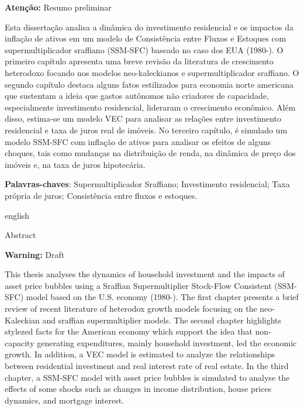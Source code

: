 \documentclass[
12pt,				%
openright,			%
oneside,			%
a4paper,		%
english,			%
brazil,				%
sumario=tradicional,
]{abntex2}
\begin{document}
%

\begin{resumo}

\textbf{Atenção:} Resumo preliminar

Esta dissertação analisa a dinâmica do investimento residencial e os impactos da inflação de ativos em um modelo de Consistência entre Fluxos e Estoques com supermultiplicador sraffiano (SSM-SFC) baseado no caso dos EUA (1980-). O primeiro capítulo apresenta uma breve revisão da literatura de crescimento heterodoxo focando nos modelos neo-kaleckianos e supermultiplicador sraffiano. O segundo capítulo destaca alguns fatos estilizados para economia norte americana que sustentam a ideia que gastos autônomos não criadores de capacidade, especialmente investimento residencial, lideraram o crescimento econômico. Além disso, estima-se um modelo VEC para analisar as relações entre investimento residencial e taxa de juros real de imóveis. No terceiro capítulo, é simulado um modelo SSM-SFC com inflação de ativos para analisar os efeitos de alguns choques, tais como mudanças na distribuição de renda, na dinâmica de preço dos imóveis e, na taxa de juros hipotecária.


\vspace{\onelineskip}

\noindent\textbf{Palavras-chaves}: Supermultiplicador Sraffiano; Investimento residencial; Taxa própria de juros; Consistência entre fluxos e estoques.

\vspace{\onelineskip}
\vspace{\onelineskip}
\begin{otherlanguage*}{english}
	\begin{center}{\ABNTEXchapterfont\huge Abstract}\end{center}
	
	\textbf{Warning:} Draft
	
	This thesis analyses the dynamics of household investment and the impacts of asset price bubbles using a Sraffian Supermultiplier Stock-Flow Consistent (SSM-SFC) model based on the U.S. economy (1980-). The first chapter presents a brief review of recent literature of heterodox growth models focusing on the neo-Kaleckian and sraffian supermultiplier models. The second chapter highlights stylezed facts for the American economy which support the idea that non‐capacity generating expenditures, mainly household investment, led the economic growth. In addition, a VEC model is estimated to analyze the relationships between residential investment and real interest rate of real estate. In the third chapter, a SSM-SFC model with asset price bubbles is simulated to analyse the effects of some shocks such as  changes in income distribution, house prices dynamics,  and mortgage interest.     
	

\end{otherlanguage*}
\end{resumo}
\end{document}
